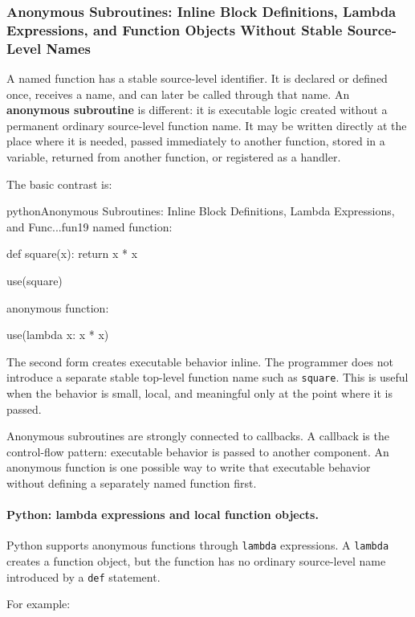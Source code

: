 \documentclass[a4paper,twoside]{report}
\begin{document}
\subsubsection{Anonymous Subroutines: Inline Block Definitions, Lambda Expressions, and Function Objects Without Stable Source-Level Names}

A named function has a stable source-level identifier. It is declared or defined once, receives a name, and can later be called through that name. An \textbf{anonymous subroutine} is different: it is executable logic created without a permanent ordinary source-level function name. It may be written directly at the place where it is needed, passed immediately to another function, stored in a variable, returned from another function, or registered as a handler.

The basic contrast is:

\begin{codebox}[]{python}{Anonymous Subroutines: Inline Block Definitions, Lambda Expressions, and Func...}{fun19}
named function:

def square(x):
    return x * x

use(square)


anonymous function:

use(lambda x: x * x)
\end{codebox}


The second form creates executable behavior inline. The programmer does not introduce a separate stable top-level function name such as \texttt{square}. This is useful when the behavior is small, local, and meaningful only at the point where it is passed.

Anonymous subroutines are strongly connected to callbacks. A callback is the control-flow pattern: executable behavior is passed to another component. An anonymous function is one possible way to write that executable behavior without defining a separately named function first.

\paragraph{Python: lambda expressions and local function objects.}

Python supports anonymous functions through \texttt{lambda} expressions. A \texttt{lambda} creates a function object, but the function has no ordinary source-level name introduced by a \texttt{def} statement.

For example:
\end{document}
